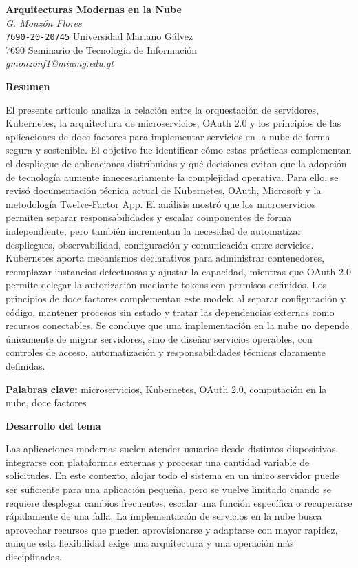 \documentclass[12pt,letterpaper]{article}
\begin{document}
\begin{center}
{\textbf{Arquitecturas Modernas en la Nube}}\\[0.25cm]
\textit{G. Monzón Flores}\\
\texttt{7690-20-20745} Universidad Mariano Gálvez\\
7690 Seminario de Tecnología de Información\\
\textit{gmonzonf1@miumg.edu.gt}
\end{center}

\textbf{Resumen}

El presente artículo analiza la relación entre la orquestación de servidores, Kubernetes, la arquitectura de microservicios, OAuth 2.0 y los principios de las aplicaciones de doce factores para implementar servicios en la nube de forma segura y sostenible. El objetivo fue identificar cómo estas prácticas complementan el despliegue de aplicaciones distribuidas y qué decisiones evitan que la adopción de tecnología aumente innecesariamente la complejidad operativa. Para ello, se revisó documentación técnica actual de Kubernetes, OAuth, Microsoft y la metodología Twelve-Factor App. El análisis mostró que los microservicios permiten separar responsabilidades y escalar componentes de forma independiente, pero también incrementan la necesidad de automatizar despliegues, observabilidad, configuración y comunicación entre servicios. Kubernetes aporta mecanismos declarativos para administrar contenedores, reemplazar instancias defectuosas y ajustar la capacidad, mientras que OAuth 2.0 permite delegar la autorización mediante tokens con permisos definidos. Los principios de doce factores complementan este modelo al separar configuración y código, mantener procesos sin estado y tratar las dependencias externas como recursos conectables. Se concluye que una implementación en la nube no depende únicamente de migrar servidores, sino de diseñar servicios operables, con controles de acceso, automatización y responsabilidades técnicas claramente definidas.

\textbf{Palabras clave:} microservicios, Kubernetes, OAuth 2.0, computación en la nube, doce factores

\textbf{Desarrollo del tema}

Las aplicaciones modernas suelen atender usuarios desde distintos dispositivos, integrarse con plataformas externas y procesar una cantidad variable de solicitudes. En este contexto, alojar todo el sistema en un único servidor puede ser suficiente para una aplicación pequeña, pero se vuelve limitado cuando se requiere desplegar cambios frecuentes, escalar una función específica o recuperarse rápidamente de una falla. La implementación de servicios en la nube busca aprovechar recursos que pueden aprovisionarse y adaptarse con mayor rapidez, aunque esta flexibilidad exige una arquitectura y una operación más disciplinadas.
\end{document}
